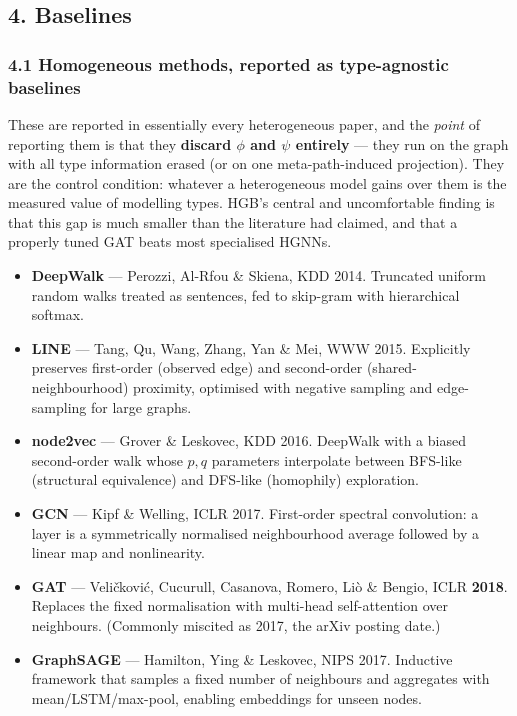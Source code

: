 \subsection*{4. Baselines}

\subsubsection*{4.1 Homogeneous methods, reported as type-agnostic baselines}

These are reported in essentially every heterogeneous paper, and the \emph{point} of reporting
them is that they \textbf{discard $\phi$ and $\psi$ entirely} --- they run on the graph with all
type information erased (or on one meta-path-induced projection). They are the control condition:
whatever a heterogeneous model gains over them is the measured value of modelling types. HGB's
central and uncomfortable finding is that this gap is much smaller than the literature had
claimed, and that a properly tuned GAT beats most specialised HGNNs.

\begin{itemize}\itemsep2pt
\item \textbf{DeepWalk} --- Perozzi, Al-Rfou \& Skiena, KDD 2014. Truncated uniform random walks
  treated as sentences, fed to skip-gram with hierarchical softmax.
\item \textbf{LINE} --- Tang, Qu, Wang, Zhang, Yan \& Mei, WWW 2015. Explicitly preserves
  first-order (observed edge) and second-order (shared-neighbourhood) proximity, optimised with
  negative sampling and edge-sampling for large graphs.
\item \textbf{node2vec} --- Grover \& Leskovec, KDD 2016. DeepWalk with a biased second-order walk
  whose $p,q$ parameters interpolate between BFS-like (structural equivalence) and DFS-like
  (homophily) exploration.
\item \textbf{GCN} --- Kipf \& Welling, ICLR 2017. First-order spectral convolution: a layer is a
  symmetrically normalised neighbourhood average followed by a linear map and nonlinearity.
\item \textbf{GAT} --- Veli\v{c}kovi\'{c}, Cucurull, Casanova, Romero, Li\`{o} \& Bengio, ICLR
  \textbf{2018}. Replaces the fixed normalisation with multi-head self-attention over neighbours.
  (Commonly miscited as 2017, the arXiv posting date.)
\item \textbf{GraphSAGE} --- Hamilton, Ying \& Leskovec, NIPS 2017. Inductive framework that
  samples a fixed number of neighbours and aggregates with mean/LSTM/max-pool, enabling embeddings
  for unseen nodes.
\end{itemize}

